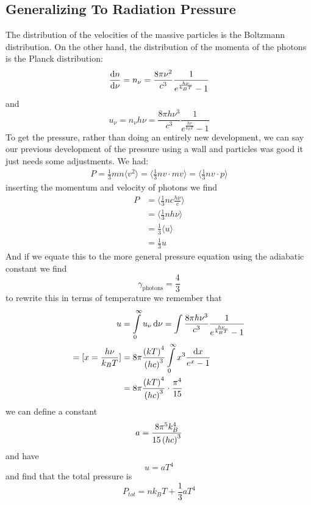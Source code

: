 \subsection{Generalizing To Radiation Pressure}
The distribution of the velocities of the massive particles is the Boltzmann distribution. On the other hand, the distribution of the momenta of the photons is the Planck distribution:
\begin{equation}
	\diff{n}{\nu}=n_\nu = \frac{8\pi \nu^2}{c^3}\frac{1}{e^{\frac{h\nu}{k_B T}}-1}
\end{equation}
and
\begin{equation}
	u_\nu = n_\nu h\nu = \frac{8\pi h\nu^3}{c^3}\frac{1}{e^{\frac{h\nu}{k_B T}}-1}
\end{equation}
To get the pressure, rather than doing an entirely new development, we can say our previous development of the pressure using a wall and particles was good it just needs some adjustments. We had:
\begin{align}
	P =\frac{1}{3}mn\langle v^2 \rangle = \langle \frac{1}{3}nv\cdot mv\rangle = \langle \frac{1}{3}nv\cdot p\rangle
\end{align}
inserting the momentum and velocity of photons we find
\begin{align}
	P &= \langle \frac{1}{3}nc\frac{h\nu}{c}\rangle \\
	&= \langle \frac{1}{3}nh\nu\rangle \\
	&= \frac{1}{3}\langle u \rangle \\
	&= \frac{1}{3}u
\end{align}
And if we equate this to the more general pressure equation using the adiabatic constant we find
\begin{equation}
	\gamma_{\text{photons}} = \frac{4}{3}
\end{equation}
to rewrite this in terms of temperature we remember that
\begin{align}
	u &= \int\limits_0^\infty u_\nu\mathop{}\!\mathrm{d}\nu = \int\frac{8\pi h\nu^3}{c^3}\frac{1}{e^{\frac{h\nu}{k_B T}}-1}\\
	=[x=\frac{h\nu}{k_B T}] &= 8\pi\frac{\left(kT\right)^4}{\left(hc\right)^3}\int\limits_0^\infty x^3\frac{\mathop{}\!\mathrm{d} x}{e^x-1}\\
	&= 8\pi\frac{\left(kT\right)^4}{\left(hc\right)^3} \cdot \frac{\pi^4}{15}
\end{align}
we can define a constant
\begin{equation}
	a = \frac{8\pi^5 k_B^4}{15\left(hc\right)^3}
\end{equation}
and have
\begin{equation}
	u = aT^4
\end{equation}
and find that the total pressure is
\begin{equation}
	P_{tot} = nk_B T+\frac{1}{3}aT^4
\end{equation}
